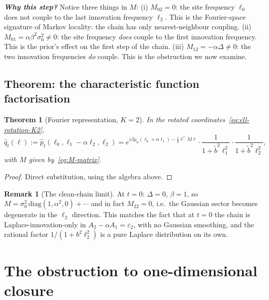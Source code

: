 \documentclass[11pt,a4paper,openany]{book}
\theoremstyle{plainserif}
\newtheorem{theorem}{Theorem}[chapter]
\theoremstyle{definition}
\theoremstyle{remarkstyle}
\newtheorem*{remark}{Remark}
\newenvironment{whybox}{%
  \begin{center}\begin{minipage}{0.95\linewidth}\small
  \textbf{\textit{Why this step?}}\quad\ignorespaces}{%
  \end{minipage}\end{center}}
\newcommand{\btilde}{\tilde{b}}
\newcommand{\hatfn}[1]{\widehat{#1}}
\begin{document}
\begin{whybox}
Notice three things in $M$:
(i) $M_{02} = 0$: the site frequency $\ell_0$ does not couple to the
last innovation frequency $\ell_2$. This is the Fourier-space signature of
Markov locality: the chain has only nearest-neighbour coupling.
(ii) $M_{01} = \alpha\beta^2\sigma_0^2 \neq 0$: the site frequency
\emph{does} couple to the first innovation frequency. This is the
prior's effect on the first step of the chain.
(iii) $M_{12} = -\alpha\Delta \neq 0$: the two innovation frequencies
\emph{do} couple. This is the obstruction we now examine.
\end{whybox}

\section{Theorem: the characteristic function factorisation}

\begin{theorem}[Fourier representation, $K{=}2$]
\label{thm:K2-fourier}
In the rotated coordinates~\eqref{eq:ell-rotation-K2},
\begin{equation}
\hatfn q_t(\ell) :=
\hatfn p_t(\ell_0, \ell_1 - \alpha\ell_2, \ell_2)
= e^{i\beta\mu_0(\ell_0 + \alpha\ell_1) - \tfrac{1}{2}\ell^\top M \ell}\cdot
  \frac{1}{1 + \btilde^2 \ell_1^2}\cdot \frac{1}{1 + \btilde^2 \ell_2^2},
\label{eq:K2-rotated-cf}
\end{equation}
with $M$ given by~\eqref{eq:M-matrix}.
\end{theorem}

\begin{proof}
Direct substitution, using the algebra above.
\end{proof}

\begin{remark}[The clean-chain limit]
At $t=0$: $\Delta=0$, $\beta=1$, so
$M = \sigma_0^2\,\mathrm{diag}(1, \alpha^2, 0) + \cdots$ and in fact
$M_{22} = 0$, i.e.\ the Gaussian sector becomes degenerate in the $\ell_2$
direction. This matches the fact that at $t=0$ the chain is
Laplace-innovation-only in $A_2 - \alpha A_1 = \varepsilon_2$, with no
Gaussian smoothing, and the rational factor $1/(1 + b^2 \ell_2^2)$ is
a pure Laplace distribution on its own.
\end{remark}

\chapter{The obstruction to one-dimensional closure}
\label{ch:K2-obstruction}
\end{document}
